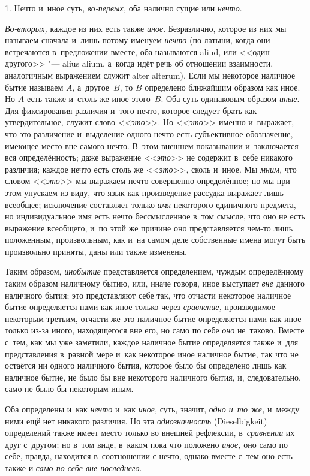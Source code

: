 
1. Нечто и~иное суть, {\em во-первых,} оба налично сущие или {\em нечто}.

{\em Во-вторых,} каждое из них есть также {\em иное}. Безразлично, которое из
них мы называем сначала и~лишь потому именуем {\em нечто} (по-латыни, когда они
встречаются в~предложении вместе, оба называются aliud, или <<один другого>>
"--- alius alium, а~когда идёт речь об отношении взаимности, аналогичным
выражением служит alter alterum). Если мы некоторое наличное бытие называем
$A$, а~другое~$B$, то $B$ определено ближайшим образом как иное. Но $A$ есть
также и~столь же иное этого~$B$. Оба суть одинаковым образом {\em иные}. Для
фиксирования различия и~того нечто, которое следует брать как утвердительное,
служит слово <<{\em это}>>. Но <<{\em это}>> именно и~выражает, что это
различение и~выделение одного нечто есть субъективное обозначение, имеющее
место вне самого нечто. В~этом внешнем показывании и~заключается вся
определённость; даже выражение <<{\em это}>> не содержит в~себе никакого
различия; каждое нечто есть столь же <<{\em это}>>, сколь и~иное. Мы
{\em мним,} что словом <<{\em это}>> мы выражаем нечто совершенно определённое;
но мы при этом упускаем из виду, что язык как произведение рассудка выражает
лишь всеобщее; исключение составляет только {\em имя} некоторого единичного
предмета, но индивидуальное имя есть нечто бессмысленное в~том смысле, что оно
не есть выражение всеобщего, и~по этой же причине оно представляется чем-то
лишь положенным, произвольным, как и~на самом деле собственные имена могут быть
произвольно приняты, даны или также изменены.

Таким образом, {\em инобытие} представляется определением, чуждым определённому
таким образом наличному бытию, или, иначе говоря, иное выступает {\em вне}
данного наличного бытия; это представляют себе так, что отчасти некоторое
наличное бытие определяется нами как иное только через {\em сравнение,}
производимое некоторым третьим, отчасти же это наличное бытие определяется нами
как иное только из-за иного, находящегося вне его, но само по себе {\em оно}
не~таково. Вместе с~тем, как мы уже заметили, каждое наличное бытие
определяется также и~для представления в~равной мере и~как некоторое иное
наличное бытие, так что не остаётся ни одного наличного бытия, которое было бы
определено лишь как наличное бытие, не было бы вне некоторого наличного бытия,
и, следовательно, само не было бы некоторым иным.

Оба определены и~как {\em нечто} и~как {\em иное,} суть, значит,
{\em одно и~то же,} и~между ними ещё нет никакого различия. Но эта
{\em однозначность} (Diesel\-bigkeit) определений также имеет место только во
внешней рефлексии, в~{\em сравнении} их друг с~другом; но в~том виде, в~каком
пока что положено {\em иное,} оно само по себе, правда, находится в~соотношении
с нечто, однако вместе с~тем оно есть также и
{\em само по себе вне последнего}.

